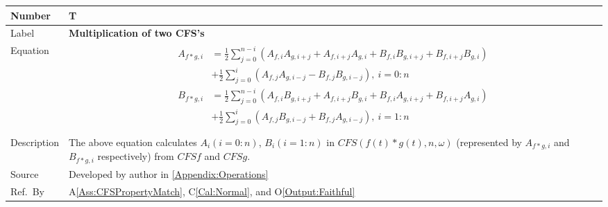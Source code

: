 \documentclass[12pt]{article}
\newcommand{\colAwidth}{0.13\textwidth}
\newcommand{\colBwidth}{0.82\textwidth}
\newcounter{theorynum} %
\newcommand{\aref}[1]{A\ref{#1}}
\newcommand{\calref}[1]{C\ref{#1}}
\newcommand{\oref}[1]{O\ref{#1}}
\begin{document}
\noindent
\begin{minipage}{\textwidth}
	\renewcommand*{\arraystretch}{1.5}
	\begin{tabular}{| p{\colAwidth} | p{\colBwidth}|}
		\hline
		\rowcolor[gray]{0.9}
		Number& T{theorynum}\thetheorynum \label{T:Multiplication}\\
		\hline
		Label&\bf Multiplication of two CFS's\\
		\hline
		Equation&  
		\begin{equation}
		\begin{aligned}
		A_{f*g, i}&=\frac{1}{2}\sum_{j=0}^{n-i}(A_{f,i}A_{g,i+j}
		+A_{f, i+j}A_{g, i}+B_{f,i}B_{g,i+j}+B_{f,i+j}B_{g,i})\\
		&+\frac{1}{2}\sum_{j=0}^{i}(A_{f,j}A_{g,i-j}-B_{f,j}B_{g,i-j}),
		~i=0:n\\
		B_{f*g, i}&=\frac{1}{2}\sum_{j=0}^{n-i}(A_{f,i}B_{g,i+j}
		+A_{f, i+j}B_{g, i}+B_{f,i}A_{g,i+j}+B_{f,i+j}A_{g,i})\\
		&+\frac{1}{2}\sum_{j=0}^{i}(A_{f,j}B_{g,i-j}+B_{f,j}A_{g,i-j}),
		~i=1:n\\
		\end{aligned}
		\end{equation}\\
		\hline
		Description & The above equation calculates $A_i(i=0:n)$, 
		$B_i(i=1:n)$ in $\mathit{CFS}(f(t)*g(t), n, \omega)$ 
		(represented by $A_{f*g, i}$ and $B_{f*g, i}$ respectively) 
		from $\mathit{CFSf}$ and $\mathit{CFSg}$.\\
		\hline
		Source & Developed by author in \autoref{Appendix:Operations}\\
		\hline
		Ref.\ By & \aref{Ass:CFSPropertyMatch}, \calref{Cal:Normal}, 
		and \oref{Output:Faithful}\\
		\hline
	\end{tabular}
\end{minipage}\\
\end{document}
